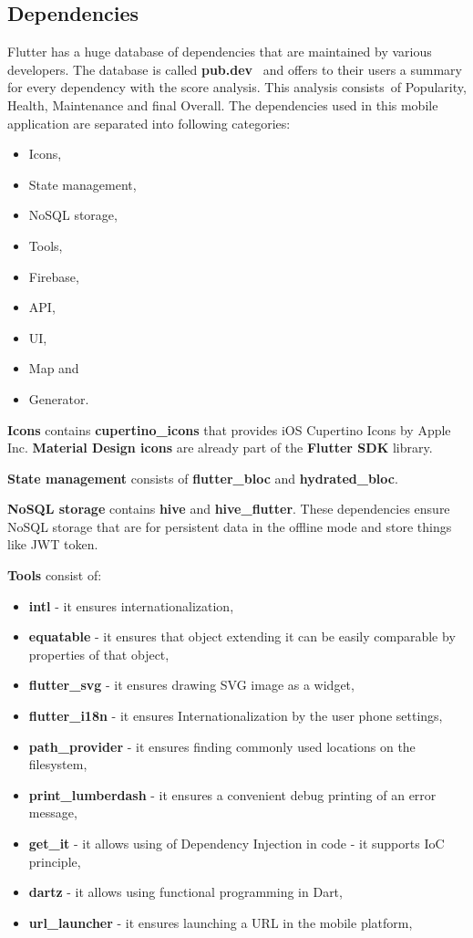 \subsection{Dependencies}\label{subsec:dependencies}
Flutter has a huge database of dependencies that are maintained by various developers.
The database is called \textbf{pub.dev}~\cite{pubDev} and offers to their users a summary for every dependency with the score analysis.
This analysis consists~of Popularity, Health, Maintenance and final Overall.
The dependencies used in this mobile application are separated into following categories:
\begin{itemize}
    \item Icons,
    \item State management,
    \item NoSQL storage,
    \item Tools,
    \item Firebase,
    \item API,
    \item UI,
    \item Map and
    \item Generator.
\end{itemize}

\textbf{Icons} contains \textbf{cupertino\_icons} that provides iOS Cupertino Icons by Apple Inc.
\textbf{Material Design icons} are already part of the \textbf{Flutter SDK} library.

\textbf{State management} consists of \textbf{flutter\_bloc} and \textbf{hydrated\_bloc}.

\textbf{NoSQL storage} contains \textbf{hive} and \textbf{hive\_flutter}.
These dependencies ensure NoSQL storage that are for persistent data in the offline mode and store things like JWT token.\cite{jwtToken}

\textbf{Tools} consist of:
\begin{itemize}
    \item \textbf{intl} - it ensures internationalization,
    \item \textbf{equatable} - it ensures that object extending it can be easily comparable by properties of that object,
    \item \textbf{flutter\_svg} - it ensures drawing SVG image as a widget,
    \item \textbf{flutter\_i18n} - it ensures Internationalization by the user phone settings,
    \item \textbf{path\_provider} - it ensures finding commonly used locations on the filesystem,
    \item \textbf{print\_lumberdash} - it ensures a convenient debug printing of an error message,
    \item \textbf{get\_it} - it allows using of Dependency Injection in code - it supports IoC principle,\cite{iocPrinciple}
    \item \textbf{dartz} - it allows using functional programming in Dart,
    \item \textbf{url\_launcher} - it ensures launching a URL in the mobile platform,
\end{itemize}

